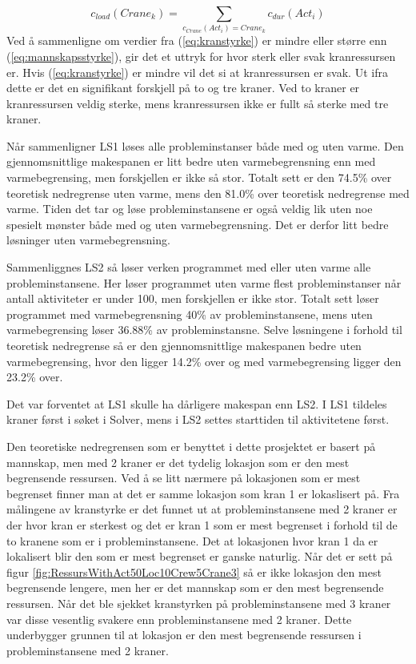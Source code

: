 \begin{equation}
c_{load}(Crane_{k}) = \sum_{c_{Crane}(Act_{i})=Crane_{k}} c_{dur}(Act_{i})
\label{eq:kranstyrke}
\end{equation}
Ved å sammenligne om verdier fra (\ref{eq:kranstyrke}) er mindre eller større enn (\ref{eq:mannskapsstyrke}), gir det et uttryk for hvor sterk eller svak kranressursen er. Hvis (\ref{eq:kranstyrke}) er mindre vil det si at kranressursen er svak. Ut ifra dette er det en signifikant forskjell på to og tre kraner. Ved to kraner er kranressursen veldig sterke, mens kranressursen ikke er fullt så sterke med tre kraner.

Når sammenligner LS1 løses alle probleminstanser både med og uten varme. Den gjennomsnittlige makespanen er litt bedre uten varmebegrensning enn med varmebegrensing, men forskjellen er ikke så stor. Totalt sett er den 74.5\% over teoretisk nedregrense uten varme, mens den 81.0\% over teoretisk nedregrense med varme. Tiden det tar og løse probleminstansene er også veldig lik uten noe spesielt mønster både med og uten varmebegrensning. Det er derfor litt bedre løsninger uten varmebegrensning.

Sammenliggnes LS2 så løser verken programmet med eller uten varme alle probleminstansene. Her løser programmet uten varme flest probleminstanser når antall aktiviteter er under 100, men forskjellen er ikke stor. Totalt sett løser programmet med varmebegrensning 40\% av probleminstansene, mens uten varmebegrensing løser 36.88\% av probleminstansne. Selve løsningene i forhold til teoretisk nedregrense så er den gjennomsnittlige makespanen bedre uten varmebegrensing, hvor den ligger 14.2\% over og med varmebegrensing ligger den 23.2\% over.

Det var forventet at LS1 skulle ha dårligere makespan enn LS2. I LS1 tildeles kraner først i søket i Solver, mens i LS2 settes starttiden til aktivitetene først.

Den teoretiske nedregrensen som er benyttet i dette prosjektet er basert på mannskap, men med 2 kraner er det tydelig lokasjon som er den mest begrensende ressursen. Ved å se litt nærmere på lokasjonen som er mest begrenset finner man at det er samme lokasjon som kran 1 er lokaslisert på. Fra målingene av kranstyrke er det funnet ut at probleminstansene med 2 kraner er der hvor kran er sterkest og det er kran 1 som er mest begrenset i forhold til de to kranene som er i probleminstansene. Det at lokasjonen hvor kran 1 da er lokalisert blir den som er mest begrenset er ganske naturlig. Når det er sett på figur \ref{fig:RessursWithAct50Loc10Crew5Crane3} så er ikke lokasjon den mest begrensende lengere, men her er det mannskap som er den mest begrensende ressursen. Når det ble sjekket kranstyrken på probleminstansene med 3 kraner var disse vesentlig svakere enn probleminstansene med 2 kraner. Dette underbygger grunnen til at lokasjon er den mest begrensende ressursen i probleminstansene med 2 kraner.

